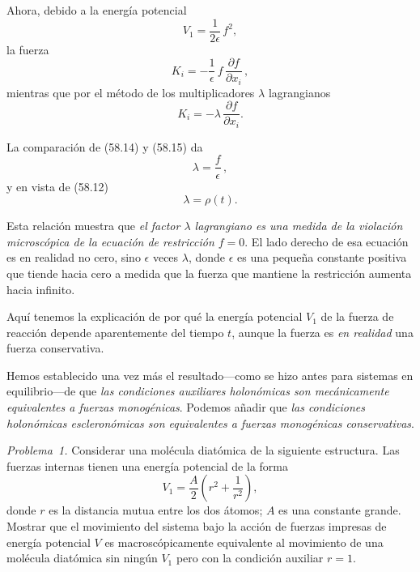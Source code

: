 \documentclass[12pt,a4paper]{book}
\begin{document}

Ahora, debido a la energía potencial
\begin{equation}
V_1 = \frac{1}{2\epsilon}\,f^2, \tag{58.13}
\end{equation}
la fuerza
\begin{equation}
K_i = -\frac{1}{\epsilon}\,f\,\frac{\partial f}{\partial x_i}\,, \tag{58.14}
\end{equation}
mientras que por el método de los multiplicadores $\lambda$ lagrangianos
\begin{equation}
K_i = -\lambda\,\frac{\partial f}{\partial x_i}. \tag{58.15}
\end{equation}

La comparación de (58.14) y (58.15) da
\begin{equation}
\lambda = \frac{f}{\epsilon}\,, \tag{58.16}
\end{equation}
y en vista de (58.12)
\begin{equation}
\lambda = \rho(t). \tag{58.17}
\end{equation}

Esta relación muestra que \textit{el factor $\lambda$ lagrangiano es una medida de la violación microscópica de la ecuación de restricción $f = 0$}. El lado derecho de esa ecuación es en realidad no cero, sino $\epsilon$ veces $\lambda$, donde $\epsilon$ es una pequeña constante positiva que tiende hacia cero a medida que la fuerza que mantiene la restricción aumenta hacia infinito.

Aquí tenemos la explicación de por qué la energía potencial $V_1$ de la fuerza de reacción depende aparentemente del tiempo $t$, aunque la fuerza es \textit{en realidad} una fuerza conservativa.

Hemos establecido una vez más el resultado---como se hizo antes para sistemas en equilibrio---de que \textit{las condiciones auxiliares holonómicas son mecánicamente equivalentes a fuerzas monogénicas}. Podemos añadir que \textit{las condiciones holonómicas escleronómicas son equivalentes a fuerzas monogénicas conservativas}.

\textit{Problema~1.} Considerar una molécula diatómica de la siguiente estructura. Las fuerzas internas tienen una energía potencial de la forma
\[
V_1 = \frac{A}{2}\left(r^2 + \frac{1}{r^2}\right),
\]
donde $r$ es la distancia mutua entre los dos átomos; $A$ es una constante grande. Mostrar que el movimiento del sistema bajo la acción de fuerzas impresas de energía potencial $V$ es macroscópicamente equivalente al movimiento de una molécula diatómica sin ningún $V_1$ pero con la condición auxiliar $r = 1$.
\end{document}

